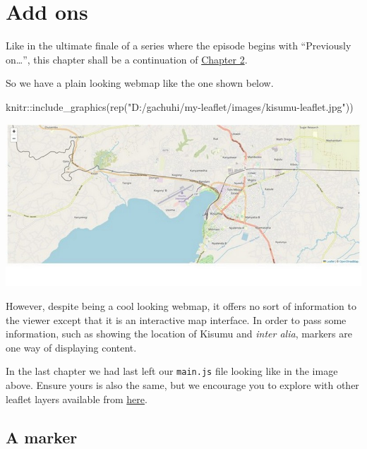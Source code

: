 \documentclass[
]{book}
\newenvironment{Shaded}{\begin{snugshade}}{\end{snugshade}}
\newcommand{\FunctionTok}[1]{\textcolor[rgb]{0.00,0.00,0.00}{#1}}
\newcommand{\NormalTok}[1]{#1}
\newcommand{\SpecialCharTok}[1]{\textcolor[rgb]{0.00,0.00,0.00}{#1}}
\newcommand{\StringTok}[1]{\textcolor[rgb]{0.31,0.60,0.02}{#1}}
\begin{document}
\hypertarget{add-ons}{%
\chapter{Add ons}\label{add-ons}}

Like in the ultimate finale of a series where the episode begins with ``Previously on\ldots{}'', this chapter shall be a continuation of \protect\hyperlink{first-leaflet-map}{Chapter 2}.

So we have a plain looking webmap like the one shown below.

\begin{Shaded}
\begin{Highlighting}[]
\NormalTok{knitr}\SpecialCharTok{::}\FunctionTok{include\_graphics}\NormalTok{(}\FunctionTok{rep}\NormalTok{(}\StringTok{"D:/gachuhi/my{-}leaflet/images/kisumu{-}leaflet.jpg"}\NormalTok{))}
\end{Highlighting}
\end{Shaded}

\includegraphics[width=11.11in]{../images/kisumu-leaflet}

However, despite being a cool looking webmap, it offers no sort of information to the viewer except that it is an interactive map interface. In order to pass some information, such as showing the location of Kisumu and \emph{inter alia}, markers are one way of displaying content.

In the last chapter we had last left our \texttt{main.js} file looking like in the image above. Ensure yours is also the same, but we encourage you to explore with other leaflet layers available from \href{https://leaflet-extras.github.io/leaflet-providers/preview/}{here}.

\hypertarget{a-marker}{%
\section{A marker}\label{a-marker}}
\end{document}
